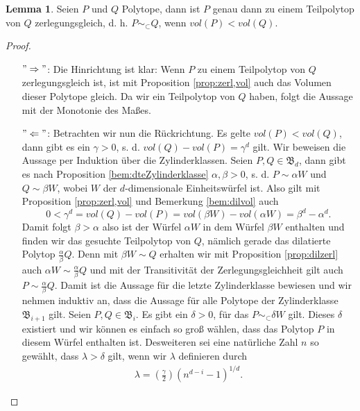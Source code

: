 \documentclass[11pt,titlepage]{article}
\theoremstyle{definition}
\newtheorem{lemma}[theorem]{Lemma}
\theoremstyle{remark}
\begin{document}
	\begin{lemma} \label{lemma:teilzerl}
		Seien $P$ und $Q$ Polytope, dann ist $P$ genau dann zu 
		einem Teilpolytop von $Q$ zerlegungsgleich, d. h. $P\sim_{\subset}Q$, wenn $vol(P)<vol(Q)$.
	\end{lemma}
	
	\begin{proof}
		\noindent
		\begin{itemize}
			\item[$"\Rightarrow"$:] Die Hinrichtung ist klar: Wenn $P$ zu einem Teilpolytop 
			von $Q$ zerlegungsgleich ist, ist mit 
			Proposition \ref{prop:zerl,vol} auch das Volumen
			dieser Polytope gleich. Da wir ein Teilpolytop von $Q$ 
			haben, folgt die Aussage mit der Monotonie des Maßes.
			\item[$"\Leftarrow"$:] Betrachten wir nun die Rückrichtung. 
			Es gelte $vol(P)<vol(Q)$, dann gibt es ein $\gamma>0$, s. d. 
			$vol(Q)-vol(P)=\gamma^d$ gilt. Wir beweisen die Aussage 
			per Induktion über die Zylinderklassen. Seien  
			$P,Q\in\mathfrak{B}_d$, dann gibt es nach Proposition 
			\ref{bem:dteZylinderklasse} $\alpha,\beta>0$, s. d. 
			$P\sim \alpha W$ und $Q\sim \beta W$, wobei $W$ 
			der $d$-dimensionale Einheitswürfel ist. Also gilt 
			mit Proposition \ref{prop:zerl,vol} und Bemerkung 
			\ref{bem:dilvol} auch
			\[0<\gamma^d =vol(Q)-vol(P)=vol(\beta W)-vol(\alpha W)
			=\beta^d -\alpha^d.\]
			Damit folgt $\beta>\alpha$ also ist der Würfel $\alpha W$ 
			in dem Würfel $\beta W$ enthalten und finden wir 
			das gesuchte Teilpolytop von $Q$, nämlich gerade 
			das dilatierte Polytop $\frac{\alpha}{\beta}Q$. Denn 
			mit $\beta W\sim Q$ erhalten wir mit 
			Proposition \ref{prop:dilzerl} auch 
			$\alpha W\sim \frac{\alpha}{\beta}Q$ und mit der 
			Transitivität der Zerlegungsgleichheit 
			gilt auch $P\sim \frac{\alpha}{\beta}Q$. Damit ist 
			die Aussage für die letzte Zylinderklasse bewiesen und 
			wir nehmen induktiv an, dass die Aussage für alle Polytope 
			der Zylinderklasse $\mathfrak{B}_{i+1}$ gilt. Seien  
			$P,Q\in\mathfrak{B}_i$. Es gibt ein $\delta>0$, für das 
			$P\sim_{\subset}\delta W$ gilt. Dieses $\delta$ existiert und 
			wir können es einfach so groß wählen, dass das Polytop $P$ 
			in diesem Würfel enthalten ist. Desweiteren sei eine 
			natürliche Zahl $n$ so gewählt, dass $\lambda>\delta$ gilt, wenn 
			wir $\lambda$ definieren durch 
			\begin{align}
				\lambda=\left(\frac{\gamma}{2}\right)(n^{d-i}-1)^{1/d}. \label{lemma:teilzerl;6}
			\end{align}

\end{itemize}
\end{proof}
\end{document}
